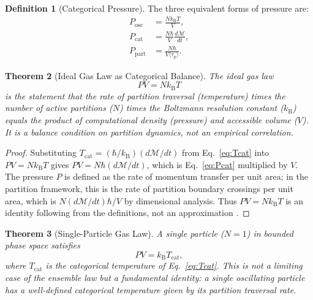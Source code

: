 \documentclass[11pt,twocolumn,a4paper]{article}
\theoremstyle{plain}
\newtheorem{theorem}{Theorem}[section]
\theoremstyle{definition}
\newtheorem{definition}[theorem]{Definition}
\theoremstyle{remark}
\newcommand{\kB}{k_{\mathrm{B}}}
\newcommand{\Tcat}{T_{\mathrm{cat}}}
\newcommand{\Pcat}{P_{\mathrm{cat}}}
\newcommand{\Depth}{\mathcal{M}}
\newcommand{\taup}{\tau_{\mathrm{p}}}
\begin{document}
\begin{definition}[Categorical Pressure]
\label{def:cat_pressure}
The three equivalent forms of pressure are:
\begin{align}
P_{\mathrm{osc}} &= \frac{N \kB T}{V}, \label{eq:Posc}\\
\Pcat &= \frac{N \hbar}{V} \frac{d\Depth}{dt}, \label{eq:Pcat}\\
P_{\mathrm{part}} &= \frac{N \hbar}{V \langle \taup \rangle}. \label{eq:Ppart}
\end{align}
\end{definition}

\begin{theorem}[Ideal Gas Law as Categorical Balance]
\label{thm:ideal_gas}
The ideal gas law
\begin{equation}
PV = N \kB T
\label{eq:ideal_gas}
\end{equation}
is the statement that the rate of partition traversal (temperature) times the number of active partitions ($N$) times the Boltzmann resolution constant ($\kB$) equals the product of computational density (pressure) and accessible volume ($V$). It is a balance condition on partition dynamics, not an empirical correlation.
\end{theorem}

\begin{proof}
Substituting $\Tcat = (\hbar/\kB)(d\Depth/dt)$ from Eq.~\eqref{eq:Tcat} into $PV = N\kB T$ gives $PV = N\hbar(d\Depth/dt)$, which is Eq.~\eqref{eq:Pcat} multiplied by $V$. The pressure $P$ is defined as the rate of momentum transfer per unit area; in the partition framework, this is the rate of partition boundary crossings per unit area, which is $N(d\Depth/dt)\hbar/V$ by dimensional analysis. Thus $PV = N\kB T$ is an identity following from the definitions, not an approximation \cite{sachikonye2026gas}.
\end{proof}

\begin{theorem}[Single-Particle Gas Law]
\label{thm:single_particle}
A single particle ($N = 1$) in bounded phase space satisfies
\begin{equation}
PV = \kB \Tcat,
\label{eq:single_particle}
\end{equation}
where $\Tcat$ is the categorical temperature of Eq.~\eqref{eq:Tcat}. This is not a limiting case of the ensemble law but a fundamental identity: a single oscillating particle has a well-defined categorical temperature given by its partition traversal rate.
\end{theorem}
\end{document}
